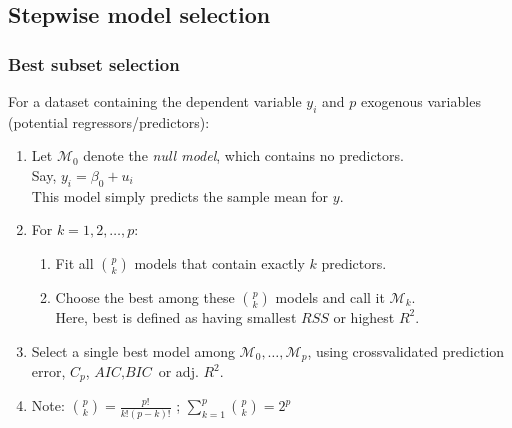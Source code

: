 \documentclass{beamer}
\begin{document}
\subsection{Stepwise model selection}
\begin{frame}
\frametitle{Best subset selection}
For a dataset containing the dependent variable $y_i$ and $p$ exogenous variables (potential regressors/predictors):
\begin{enumerate}
  \item Let $\mathcal{M}_0$ denote the \textit{null model}, which contains no predictors.
  \\Say, $y_i=\beta_0+u_i$
  \\ This model simply predicts the sample mean for $y$.
  \item For $k= 1,2, \dots ,p$:
  \begin{enumerate}[{(a)}]
  \item Fit all $\binom{p}{k}$ models that contain exactly $k$ predictors.
  \item Choose the best among these $\binom{p}{k}$ models and call it $\mathcal{M}_{k}$.
        \\Here, best is defined as having smallest $\textit{RSS}$ or highest $R^2$.
\end{enumerate}
  \item Select a single best model among $\mathcal{M}_0, \dots, \mathcal{M}_{p}$, using crossvalidated prediction error, $C_p$, $\textit{AIC}, \textit{BIC}$ or adj. $R^2$.

\vspace{0.8cm}

\item[] Note: $\binom{p}{k}=\frac{p!}{k!(p-k)!}$ \hspace{0.5cm}; \hspace{0.5cm} $\sum_{k=1}^p \binom{p}{k} = 2^p$

\end{enumerate}
\end{frame}
\end{document}
